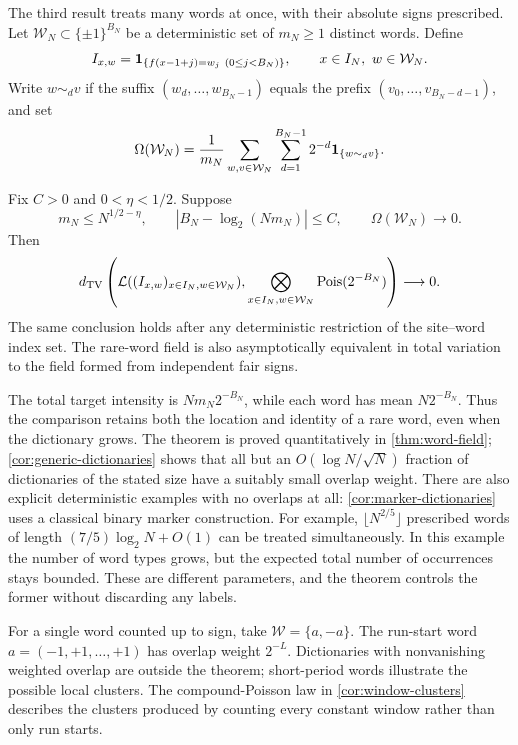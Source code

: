 The third result treats many words at once, with their absolute signs
prescribed. Let $\mathcal W_N\subset\{\pm1\}^{B_N}$ be a deterministic
set of $m_N\ge1$ distinct words. Define
\[
 I_{x,w}=\mathbf 1_{\{f(x-1+j)=w_j\ (0\le j<B_N)\}},\qquad
                     x\in I_N,\ w\in\mathcal W_N.
\]
Write $w\sim_d v$ if the suffix $(w_d,\ldots,w_{B_N-1})$ equals the
prefix $(v_0,\ldots,v_{B_N-d-1})$, and set
\begin{equation}\label{eq:intro-overlap}
 \Omega(\mathcal W_N)=\frac1{m_N}\sum_{w,v\in\mathcal W_N}
           \sum_{d=1}^{B_N-1}2^{-d}\mathbf 1_{\{w\sim_d v\}}.
\end{equation}
\begin{theorem}\label{thm:patterns-summary}
Fix $C>0$ and $0<\eta<1/2$. Suppose
\[
 m_N\le N^{1/2-\eta},\qquad
 |B_N-\log_2(Nm_N)|\le C,\qquad
 \Omega(\mathcal W_N)\longrightarrow0.
\]
Then
\begin{equation}\label{eq:intro-word-field}
 d_{\mathrm{TV}}\left(\mathcal L((I_{x,w})_{x\in I_N,w\in\mathcal W_N}),
       \bigotimes_{x\in I_N,w\in\mathcal W_N}\operatorname{Pois}(2^{-B_N})\right)
                          \longrightarrow0.
\end{equation}
The same conclusion holds after any deterministic restriction of the
site--word index set. The rare-word field is also asymptotically equivalent
in total variation to the field formed from independent fair signs.
\end{theorem}
The total target intensity is $Nm_N2^{-B_N}$, while each word has mean
$N2^{-B_N}$. Thus the comparison retains both the location and identity
of a rare word, even when the dictionary grows. The theorem is proved
quantitatively in \cref{thm:word-field}; \cref{cor:generic-dictionaries}
shows that all but an $O(\log N/\sqrt N)$ fraction of dictionaries of the
stated size have a suitably small overlap weight.
There are also explicit deterministic examples with no overlaps at all:
\cref{cor:marker-dictionaries} uses a classical binary marker construction.
For example, $\lfloor N^{2/5}\rfloor$ prescribed words of length
$(7/5)\log_2N+O(1)$ can be treated simultaneously. In this example the
number of word types grows, but the expected total number of occurrences
stays bounded. These are different parameters, and the theorem controls
the former without discarding any labels.

For a single word counted up to sign, take $\mathcal W=\{a,-a\}$.
The run-start word $a=(-1,+1,\ldots,+1)$ has overlap weight $2^{-L}$.
Dictionaries with nonvanishing weighted overlap are outside the theorem;
short-period words illustrate the possible local clusters.
The compound-Poisson law in \cref{cor:window-clusters} describes the
clusters produced by counting every constant window rather than only
run starts.

